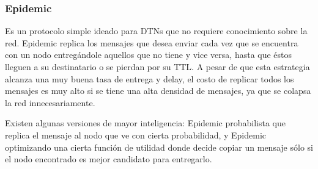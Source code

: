 \subsubsection{Epidemic}
Es un protocolo simple ideado para DTNs que no requiere conocimiento sobre la red. Epidemic\cite{epidemic} replica los mensajes que desea enviar cada vez que se encuentra con un nodo entregándole aquellos que no tiene y vice versa, hasta que éstos lleguen a su destinatario o se pierdan por su TTL. A pesar de que esta estrategia alcanza una muy buena tasa de entrega y delay, el costo de replicar todos los mensajes es muy alto si se tiene una alta densidad de mensajes, ya que se colapsa la red innecesariamente. 

Existen algunas versiones de mayor inteligencia: Epidemic probabilista que replica el mensaje al nodo que ve con cierta probabilidad, y Epidemic optimizando una cierta función de utilidad donde decide copiar un mensaje sólo si el nodo encontrado es mejor candidato para entregarlo.